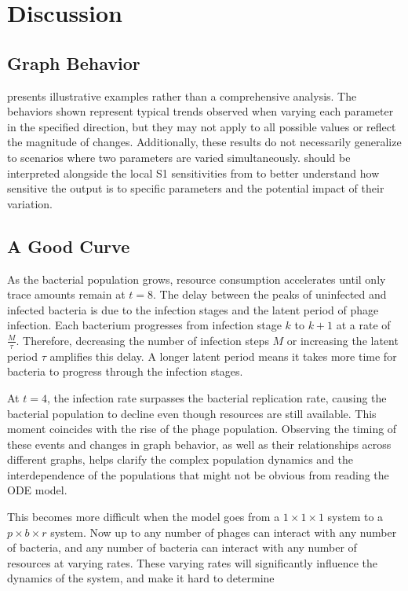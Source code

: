 \chapter{Discussion}
\label{Discussion}

\section{Graph Behavior}
 presents illustrative examples rather than a comprehensive analysis. 
The behaviors shown represent typical trends observed when varying each parameter in the specified direction, but they may not apply to all possible values or reflect the magnitude of changes. 
Additionally, these results do not necessarily generalize to scenarios where two parameters are varied simultaneously. 
 should be interpreted alongside the local S1 sensitivities from  to better understand how sensitive the output is to specific parameters and the potential impact of their variation.

\section{A Good Curve}
As the bacterial population grows, resource consumption accelerates until only trace amounts remain at $t=8$. 
The delay between the peaks of uninfected and infected bacteria is due to the infection stages and the latent period of phage infection. 
Each bacterium progresses from infection stage $k$ to $k+1$ at a rate of $\frac{M}{\tau}$. 
Therefore, decreasing the number of infection steps $M$ or increasing the latent period $\tau$ amplifies this delay. 
A longer latent period means it takes more time for bacteria to progress through the infection stages.

At $t=4$, the infection rate surpasses the bacterial replication rate, causing the bacterial population to decline even though resources are still available. 
This moment coincides with the rise of the phage population. 
Observing the timing of these events and changes in graph behavior, as well as their relationships across different graphs, helps clarify the complex population dynamics and the interdependence of the populations that might not be obvious from reading the ODE model. 

This becomes more difficult when the model goes from a $1\times1\times1$ system to a $p\times b \times r$ system. 
Now up to any number of phages can interact with any number of bacteria, and any number of bacteria can interact with any number of resources at varying rates. 
These varying rates will significantly influence the dynamics of the system, and make it hard to determine 